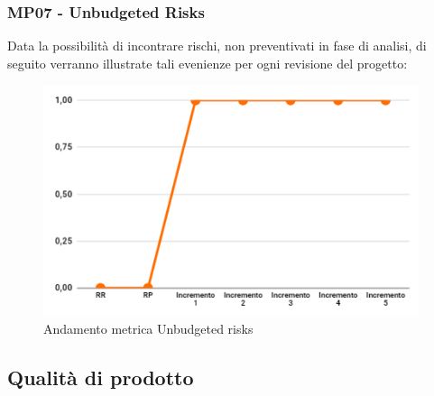 \subsubsection{MP07 - Unbudgeted Risks}
Data la possibilità di incontrare rischi, non preventivati in fase di analisi, di seguito verranno illustrate tali evenienze per ogni revisione del progetto:
\begin{figure}[H]
	\centering
	\includegraphics[width=11cm]{images/unbudgeted_risks.png}
	\caption{Andamento metrica Unbudgeted risks}
\end{figure}

\subsection{Qualità di prodotto} 

